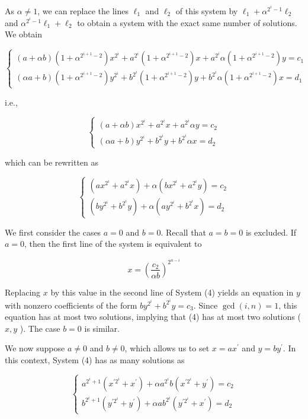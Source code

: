 \documentclass[10pt]{article}
\begin{document}
As $\alpha \neq 1$, we can replace the lines $\ell_{1}$ and $\ell_{2}$ of this system by $\ell_{1}+\alpha^{2^{i}-1} \ell_{2}$ and $\alpha^{2^{i}-1} \ell_{1}+\ell_{2}$ to obtain a system with the exact same number of solutions. We obtain

$$
\left\{\begin{array}{l}
(a+\alpha b)\left(1+\alpha^{2^{i+1}-2}\right) x^{2^{i}}+a^{2^{i}}\left(1+\alpha^{2^{i+1}-2}\right) x+a^{2^{i}} \alpha\left(1+\alpha^{2^{i+1}-2}\right) y=c_{1} \\
(\alpha a+b)\left(1+\alpha^{2^{i+1}-2}\right) y^{2^{i}}+b^{2^{i}}\left(1+\alpha^{2^{i+1}-2}\right) y+b^{2^{i}} \alpha\left(1+\alpha^{2^{i+1}-2}\right) x=d_{1}
\end{array}\right.
$$

i.e.,

$$
\left\{\begin{array}{l}
(a+\alpha b) x^{2^{i}}+a^{2^{i}} x+a^{2^{i}} \alpha y=c_{2} \\
(\alpha a+b) y^{2^{i}}+b^{2^{i}} y+b^{2^{i}} \alpha x=d_{2}
\end{array}\right.
$$

which can be rewritten as

\[
\left\{\begin{array}{l}
\left(a x^{2^{i}}+a^{2^{i}} x\right)+\alpha\left(b x^{2^{i}}+a^{2^{i}} y\right)=c_{2}  \tag{4}\\
\left(b y^{2^{i}}+b^{2^{i}} y\right)+\alpha\left(a y^{2^{i}}+b^{2^{i}} x\right)=d_{2}
\end{array}\right.
\]

We first consider the cases $a=0$ and $b=0$. Recall that $a=b=0$ is excluded. If $a=0$, then the first line of the system is equivalent to

$$
x=\left(\frac{c_{2}}{\alpha b}\right)^{2^{n-i}}
$$

Replacing $x$ by this value in the second line of System (4) yields an equation in $y$ with nonzero coefficients of the form $b y^{2^{i}}+b^{2^{i}} y=c_{3}$. Since $\operatorname{gcd}(i, n)=1$, this equation has at most two solutions, implying that (4) has at most two solutions ( $x, y$ ). The case $b=0$ is similar.

We now suppose $a \neq 0$ and $b \neq 0$, which allows us to set $x=a x^{\prime}$ and $y=b y^{\prime}$. In this context, System (4) has as many solutions as

$$
\left\{\begin{array}{l}
a^{2^{i}+1}\left(x^{\prime 2^{i}}+x^{\prime}\right)+\alpha a^{2^{i}} b\left(x^{\prime 2^{i}}+y^{\prime}\right)=c_{2} \\
b^{2^{i}+1}\left(y^{\prime 2^{i}}+y^{\prime}\right)+\alpha a b^{2^{i}}\left(y^{\prime 2^{i}}+x^{\prime}\right)=d_{2}
\end{array}\right.
$$
\end{document}
